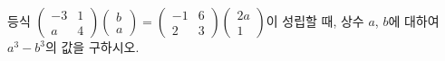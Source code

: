 등식 $\begin{pmatrix} -3 & 1 \\ a & 4 \end{pmatrix}\begin{pmatrix} b \\ a \end{pmatrix}=\begin{pmatrix} -1 & 6 \\ 2 & 3 \end{pmatrix}\begin{pmatrix} 2a \\ 1 \end{pmatrix}$이 성립할 때, 상수 $a$, $b$에 대하여 $a^3-b^3$의 값을 구하시오.
